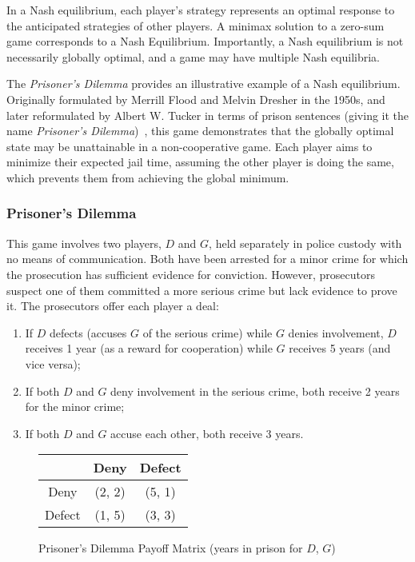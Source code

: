 \begin{remark}
	In a Nash equilibrium, each player's strategy represents an optimal response to the anticipated strategies of other players. A minimax solution to a zero-sum game corresponds to a Nash Equilibrium. Importantly, a Nash equilibrium is not necessarily globally optimal, and a game may have multiple Nash equilibria.
\end{remark}

The \textit{Prisoner's Dilemma} provides an illustrative example of a Nash equilibrium. Originally formulated by Merrill Flood and Melvin Dresher in the 1950s, and later reformulated by Albert W. Tucker in terms of prison sentences (giving it the name \textit{Prisoner's Dilemma})~\cite{ref:poundstone}, this game demonstrates that the globally optimal state may be unattainable in a non-cooperative game. Each player aims to minimize their expected jail time, assuming the other player is doing the same, which prevents them from achieving the global minimum.

\subsubsection{Prisoner's Dilemma}
\label{sec:prisoners-dilemma}

This game involves two players, $D$ and $G$, held separately in police custody with no means of communication. Both have been arrested for a minor crime for which the prosecution has sufficient evidence for conviction. However, prosecutors suspect one of them committed a more serious crime but lack evidence to prove it. The prosecutors offer each player a deal:

\begin{enumerate}
	\item If $D$ defects (accuses $G$ of the serious crime) while $G$ denies involvement, $D$ receives 1 year (as a reward for cooperation) while $G$ receives 5 years (and vice versa);
	\item If both $D$ and $G$ deny involvement in the serious crime, both receive 2 years for the minor crime;
	\item If both $D$ and $G$ accuse each other, both receive 3 years.
\end{enumerate}

\begin{figure}[h]
	\centering%
	\bgroup%
	\def\arraystretch{1.4}
	\begin{tabular}[c]{|c|c|c|}
		\hline
		\diagbox{$D$}{$G$} & Deny   & Defect \\
		\hline
		Deny               & (2, 2) & (5, 1) \\
		\hline
		Defect             & (1, 5) & (3, 3) \\
		\hline
	\end{tabular}
	\egroup
	\caption{Prisoner's Dilemma Payoff Matrix (years in prison for $D$, $G$)}%
	\label{fig:prisoners-matrix}
\end{figure}

